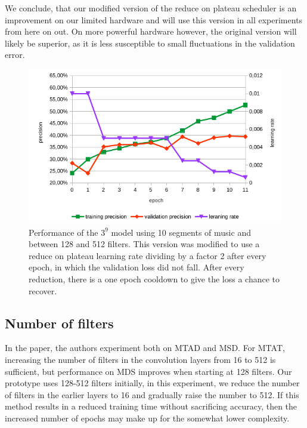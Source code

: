 We conclude, that our modified version of the reduce on plateau scheduler is an improvement on our limited hardware and will use this version in all experiments from here on out. On more powerful hardware however, the original version will likely be superior, as it is less susceptible to small fluctuations in the validation error.




\begin{figure}[!htb]
	\centering
	\includegraphics[width=.9\linewidth]{images/sample-dcnn-m3-n9-seg10-128_512-plateau_mod.png}
	\caption{Performance of the $3^9$ model using 10 segments of music and between 128 and 512 filters. This version was modified to use a reduce on plateau learning rate dividing by a factor 2 after every epoch, in which the validation loss did not fall. After every reduction, there is a one epoch cooldown to give the loss a chance to recover.}
	\label{fig:sample-dcnn-m3-n9-seg10-128_512-plateau_mod}
\end{figure}
\subsection{Number of filters}

In the paper, the authors experiment both on MTAD and MSD. For MTAT, increasing the number of filters in the convolution layers from 16 to 512 is sufficient, but performance on MDS improves when starting at 128 filters. Our prototype uses 128-512 filters initially, in this experiment, we reduce the number of filters in the earlier layers to 16 and gradually raise the number to 512. If this method results in a reduced training time without sacrificing accuracy, then the increased number of epochs may make up for the somewhat lower complexity.

